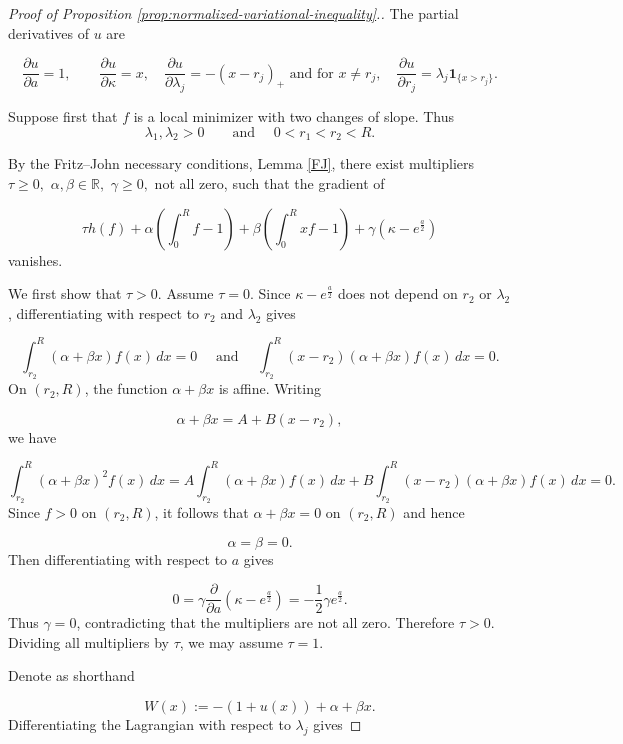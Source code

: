 \documentclass{article}
\theoremstyle{plain}
\theoremstyle{definition}
\newcommand{\dd}{\,d}
\newcommand{\1}{\mathbf 1}
\begin{document}
\begin{proof} [Proof of Proposition \ref{prop:normalized-variational-inequality}.]
The partial derivatives of \(u\) are

\[
\frac{\partial u}{\partial a}=1,
\qquad
\frac{\partial u}{\partial \kappa}=x, \quad
\frac{\partial u}{\partial \lambda_j}=-(x-r_j)_+
\text{ and for }
 x\neq r_j, \quad 
\frac{\partial u}{\partial r_j}
=
\lambda_j\1_{\{x>r_j\}}.
\]

Suppose first that \(f\) is a local minimizer with two changes of slope. Thus
\[
\lambda_1,\lambda_2>0
\qquad \text{and } \quad
0<r_1<r_2<R.
\]


By the Fritz--John necessary conditions, Lemma \ref{FJ}, there exist multipliers
$\tau\ge0,$ 
$\alpha,\beta\in\mathbb R,$ 
$\gamma\ge0,$
not all zero, such that the gradient of

\[
\tau h(f)
+
\alpha\left(\int_0^R f-1\right)
+
\beta\left(\int_0^R x f-1\right)
+
\gamma(\kappa-e^{\frac{a}2})
\]
vanishes. 

We first show that
$
\tau>0.$
Assume \(\tau=0\). Since \(\kappa-e^{\frac{a}{2}}\) does not depend on \(r_2\) or \(\lambda_2\), differentiating with respect to \(r_2\) and \(\lambda_2\) gives

\[
\int_{r_2}^R (\alpha+\beta x)f(x)\dd x=0
\quad \text{ and } \quad
\int_{r_2}^R (x-r_2)(\alpha+\beta x)f(x)\dd x=0.
\]
On \((r_2,R)\), the function \(\alpha+\beta x\) is affine. Writing 

\[
\alpha+\beta x=A+B(x-r_2),
\]
we have

\[
\int_{r_2}^R (\alpha+\beta x)^2f(x)\dd x
=
A\int_{r_2}^R (\alpha+\beta x)f(x)\dd x
+
B\int_{r_2}^R (x-r_2)(\alpha+\beta x)f(x)\dd x
=
0.
\]
Since \(f>0\) on \((r_2,R)\), it follows that
$ 
\alpha+\beta x=0
$ on $(r_2,R)$ and hence

\[
\alpha=\beta=0.
\]
Then differentiating with respect to \(a\) gives

\[
0=\gamma\frac{\partial}{\partial a}(\kappa-e^\frac{a}{2})
=
-\frac12\gamma e^{\frac{a}{2}}.
\]
Thus \(\gamma=0\), contradicting that the multipliers are not all zero. Therefore
$
\tau>0.
$
Dividing all multipliers by \(\tau\), we may assume \(\tau=1\).

Denote as shorthand

\[
W(x):=-(1+u(x))+\alpha+\beta x.
\]
Differentiating the Lagrangian with respect to \(\lambda_j\) gives


\end{proof}
\end{document}
